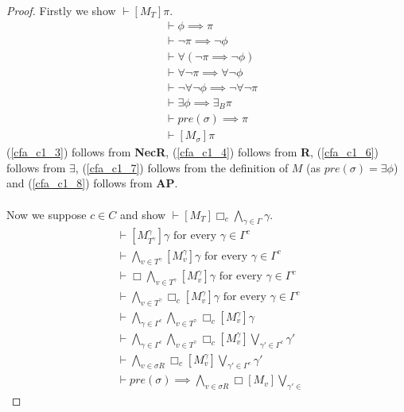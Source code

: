 \documentclass[12pt, a4paper, titlepage]{scrartcl}
\numberwithin{equation}{section}
\newcommand{\sqex}[1]{[{#1}]}
\newcommand{\axAP}{{\bf AP}}
\newcommand{\axR}{{\bf R}}
\newcommand{\axNecR}{{\bf NecR}}
\begin{document}
\begin{proof}
Firstly we show $\vdash \sqex{M_T} \pi$.
\begin{align}
	& \vdash \phi \implies \pi \label{cfa_c1_1} \\
	& \vdash \neg \pi \implies \neg \phi \label{cfa_c1_2}\\
	& \vdash \forall (\neg \pi \implies \neg \phi) \label{cfa_c1_3}\\
	& \vdash \forall \neg \pi \implies \forall \neg \phi \label{cfa_c1_4}\\
	& \vdash \neg \forall \neg \phi \implies \neg \forall \neg \pi \label{cfa_c1_5}\\
	& \vdash \exists \phi \implies \exists_B \pi \label{cfa_c1_6}\\
	& \vdash pre(\sigma) \implies \pi \label{cfa_c1_7}\\
	& \vdash \sqex{M_\sigma} \pi \label{cfa_c1_8}
\end{align}
(\ref{cfa_c1_3}) follows from \axNecR, (\ref{cfa_c1_4}) follows from \axR, (\ref{cfa_c1_6}) follows from
$\exists$, (\ref{cfa_c1_7}) follows from the definition of $M$ (as $pre(\sigma) = \exists \phi$) and
(\ref{cfa_c1_8}) follows from \axAP.\\
\\
Now we suppose $c \in C$ and show $\vdash \sqex{M_T} \Box_c \bigwedge_{\gamma \in \Gamma} \gamma$.
\begin{align}
	& \vdash \sqex{M^{\gamma}_{T^{\gamma}}} \gamma \text{ for every }\gamma \in \Gamma^c
	\label{cfa_c2_1} \\
	& \vdash \bigwedge_{v \in T^\gamma} \sqex{M^\gamma_v} \gamma \text{ for every }\gamma \in \Gamma^c \label{cfa_c2_1} \\
	& \vdash \Box \bigwedge_{v \in T^\gamma} \sqex{M^\gamma_v} \gamma \text{ for every } \gamma \in
	\Gamma^c\label{cfa_c2_2} \\
	& \vdash \bigwedge_{v \in T^\gamma} \Box_c \sqex{M^\gamma_v} \gamma \text{ for every } \gamma \in
	\Gamma^c\label{cfa_c2_3} \\
	& \vdash \bigwedge_{\gamma \in \Gamma^c} \bigwedge_{v \in T^\gamma} \Box_c \sqex{M^\gamma_v} \gamma\label{cfa_c2_4} \\
	& \vdash \bigwedge_{\gamma \in \Gamma^c} \bigwedge_{v \in T^\gamma} \Box_c \sqex{M^\gamma_v}
	\bigvee_{\gamma' \in \Gamma^c} \gamma'\label{cfa_c2_5} \\
	& \vdash \bigwedge_{v \in \sigma R} \Box_c \sqex{M^\gamma_v}\bigvee_{\gamma' \in \Gamma^c} \gamma'\label{cfa_c2_6} \\
	& \vdash pre(\sigma) \implies \bigwedge_{v \in \sigma R} \Box \sqex{M_v} \bigvee_{\gamma' \in
}
\end{align}
\end{proof}
\end{document}
